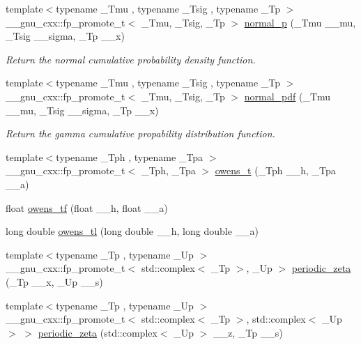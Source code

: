 \begin{DoxyCompactItemize}
\item 
{\footnotesize template$<$typename \+\_\+\+Tmu , typename \+\_\+\+Tsig , typename \+\_\+\+Tp $>$ }\\\+\_\+\+\_\+gnu\+\_\+cxx\+::fp\+\_\+promote\+\_\+t$<$ \+\_\+\+Tmu, \+\_\+\+Tsig, \+\_\+\+Tp $>$ \hyperlink{group__mathsf__gnu_gaeb735b0fb98c7684ba61b8940f50193c}{normal\+\_\+p} (\+\_\+\+Tmu \+\_\+\+\_\+mu, \+\_\+\+Tsig \+\_\+\+\_\+sigma, \+\_\+\+Tp \+\_\+\+\_\+x)
\begin{DoxyCompactList}\small\item\em Return the normal cumulative probability density function. \end{DoxyCompactList}\item 
{\footnotesize template$<$typename \+\_\+\+Tmu , typename \+\_\+\+Tsig , typename \+\_\+\+Tp $>$ }\\\+\_\+\+\_\+gnu\+\_\+cxx\+::fp\+\_\+promote\+\_\+t$<$ \+\_\+\+Tmu, \+\_\+\+Tsig, \+\_\+\+Tp $>$ \hyperlink{group__mathsf__gnu_gab795379781dea732cbc7556351760401}{normal\+\_\+pdf} (\+\_\+\+Tmu \+\_\+\+\_\+mu, \+\_\+\+Tsig \+\_\+\+\_\+sigma, \+\_\+\+Tp \+\_\+\+\_\+x)
\begin{DoxyCompactList}\small\item\em Return the gamma cumulative propability distribution function. \end{DoxyCompactList}\item 
{\footnotesize template$<$typename \+\_\+\+Tph , typename \+\_\+\+Tpa $>$ }\\\+\_\+\+\_\+gnu\+\_\+cxx\+::fp\+\_\+promote\+\_\+t$<$ \+\_\+\+Tph, \+\_\+\+Tpa $>$ \hyperlink{group__mathsf__gnu_gab4e367aae19853cca3af99eead01fcaa}{owens\+\_\+t} (\+\_\+\+Tph \+\_\+\+\_\+h, \+\_\+\+Tpa \+\_\+\+\_\+a)
\item 
float \hyperlink{group__mathsf__gnu_gac24d32e9b072c4953654d5559f992871}{owens\+\_\+tf} (float \+\_\+\+\_\+h, float \+\_\+\+\_\+a)
\item 
long double \hyperlink{group__mathsf__gnu_ga7a8bc60dc0ef4a009586872eb7cac2d0}{owens\+\_\+tl} (long double \+\_\+\+\_\+h, long double \+\_\+\+\_\+a)
\item 
{\footnotesize template$<$typename \+\_\+\+Tp , typename \+\_\+\+Up $>$ }\\\+\_\+\+\_\+gnu\+\_\+cxx\+::fp\+\_\+promote\+\_\+t$<$ std\+::complex$<$ \+\_\+\+Tp $>$, \+\_\+\+Up $>$ \hyperlink{group__mathsf__gnu_ga06b06216e87b868cb21c76d33ac560c8}{periodic\+\_\+zeta} (\+\_\+\+Tp \+\_\+\+\_\+x, \+\_\+\+Up \+\_\+\+\_\+s)
\item 
{\footnotesize template$<$typename \+\_\+\+Tp , typename \+\_\+\+Up $>$ }\\\+\_\+\+\_\+gnu\+\_\+cxx\+::fp\+\_\+promote\+\_\+t$<$ std\+::complex$<$ \+\_\+\+Tp $>$, std\+::complex$<$ \+\_\+\+Up $>$ $>$ \hyperlink{group__mathsf__gnu_gaf3704ce510319b5c4c5cedd55dfaa42f}{periodic\+\_\+zeta} (std\+::complex$<$ \+\_\+\+Up $>$ \+\_\+\+\_\+z, \+\_\+\+Tp \+\_\+\+\_\+s)

\end{DoxyCompactItemize}
